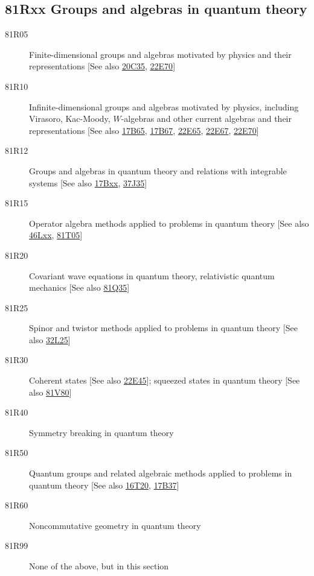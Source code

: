 \subsection*{81Rxx  Groups and algebras in quantum theory }\label{81Rxx}
\begin{description}  
\item [81R05]\label{81R05} Finite-dimensional groups and algebras motivated by physics and their representations [See also \hyperref[20C35]{20C35}, \hyperref[22E70]{22E70}]
\item [81R10]\label{81R10} Infinite-dimensional groups and algebras motivated by physics, including Virasoro, Kac-Moody, $W$-algebras and other current algebras and their representations [See also \hyperref[17B65]{17B65}, \hyperref[17B67]{17B67}, \hyperref[22E65]{22E65}, \hyperref[22E67]{22E67}, \hyperref[22E70]{22E70}]
\item [81R12]\label{81R12} Groups and algebras in quantum theory and relations with integrable systems [See also \hyperref[17Bxx]{17Bxx}, \hyperref[37J35]{37J35}]
\item [81R15]\label{81R15} Operator algebra methods applied to problems in quantum theory [See also \hyperref[46Lxx]{46Lxx}, \hyperref[81T05]{81T05}]
\item [81R20]\label{81R20} Covariant wave equations in quantum theory, relativistic quantum mechanics [See also \hyperref[81Q35]{81Q35}]
\item [81R25]\label{81R25} Spinor and twistor methods applied to problems in quantum theory [See also \hyperref[32L25]{32L25}]
\item [81R30]\label{81R30} Coherent states [See also \hyperref[22E45]{22E45}]; squeezed states in quantum theory [See also \hyperref[81V80]{81V80}]
\item [81R40]\label{81R40} Symmetry breaking in quantum theory
\item [81R50]\label{81R50} Quantum groups and related algebraic methods applied to problems in quantum theory [See also \hyperref[16T20]{16T20}, \hyperref[17B37]{17B37}]
\item [81R60]\label{81R60} Noncommutative geometry in quantum theory
\item [81R99]\label{81R99} None of the above, but in this section
\end{description}
